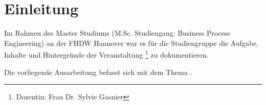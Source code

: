 \section{Einleitung}

Im Rahmen des Master Studiums (M.Sc. Studiengang: Business Process Engineering) an der FHDW Hannover
war es für die Studiengruppe  die Aufgabe, Inhalte und Hintergründe der Veranstaltung \footnote{Dozentin: Frau Dr. Sylvie Gasnier} zu dokumentieren.

Die vorliegende Ausarbeitung befasst sich mit dem Thema . 